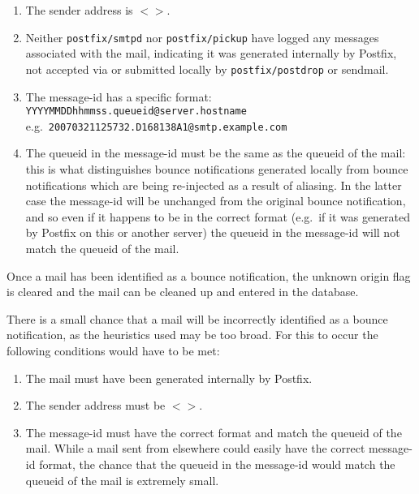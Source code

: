 \documentclass[a4paper,12pt,draft]{article}
\newcommand{\daemon}[1]{%
    \texttt{postfix/#1}%
}
\begin{document}
\begin{enumerate}

    \item The sender address is $<>$.

    \item Neither \daemon{smtpd} nor \daemon{pickup} have logged any
        messages associated with the mail, indicating it was generated
        internally by Postfix, not accepted via \SMTP{} or submitted
        locally by \daemon{postdrop} or sendmail.

    \item The message-id has a specific format: \newline
        \texttt{YYYYMMDDhhmmss.queueid@server.hostname} \newline
        e.g.\ \texttt{20070321125732.D168138A1@smtp.example.com}

    \item The queueid in the message-id must be the same as the queueid of
        the mail: this is what distinguishes bounce notifications generated
        locally from bounce notifications which are being re-injected as a
        result of aliasing.  In the latter case the message-id will be
        unchanged from the original bounce notification, and so even if it
        happens to be in the correct format (e.g.\ if it was generated by
        Postfix on this or another server) the queueid in the message-id
        will not match the queueid of the mail.

\end{enumerate}

Once a mail has been identified as a bounce notification, the unknown
origin flag is cleared and the mail can be cleaned up and entered in the
database.

There is a small chance that a mail will be incorrectly identified as a
bounce notification, as the heuristics used may be too broad.  For this to
occur the following conditions would have to be met:

\begin{enumerate}

    \item The mail must have been generated internally by Postfix.

    \item The sender address must be $<>$.

    \item The message-id must have the correct format and match the queueid
        of the mail.  While a mail sent from elsewhere could easily have
        the correct message-id format, the chance that the queueid in the
        message-id would match the queueid of the mail is extremely small.

\end{enumerate}
\end{document}
